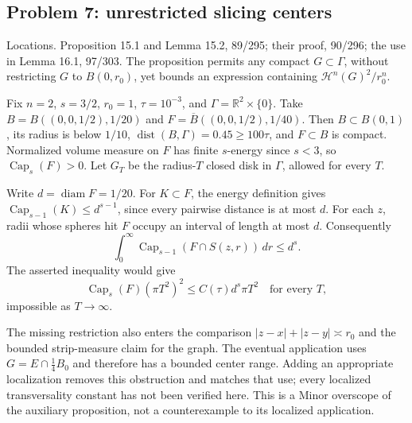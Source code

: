\documentclass[10pt]{article}
\begin{document}
\subsection*{Problem 7: unrestricted slicing centers}
Locations. Proposition 15.1 and Lemma 15.2, 89/295; their proof, 90/296; the use in Lemma 16.1, 97/303. The proposition permits any compact \(G\subset\Gamma\), without restricting \(G\) to \(B(0,r_0)\), yet bounds an expression containing \(\mathcal H^n(G)^2/r_0^n\).\par
Fix \(n=2\), \(s=3/2\), \(r_0=1\), \(\tau=10^{-3}\), and \(\Gamma=\mathbb R^2\times\{0\}\). Take \(B=B((0,0,1/2),1/20)\) and \(F=\overline B((0,0,1/2),1/40)\). Then \(B\subset B(0,1)\), its radius is below \(1/10\), \(\operatorname{dist}(B,\Gamma)=0.45\ge100\tau\), and \(F\subset B\) is compact. Normalized volume measure on \(F\) has finite \(s\)-energy since \(s<3\), so \(\operatorname{Cap}_s(F)>0\). Let \(G_T\) be the radius-\(T\) closed disk in \(\Gamma\), allowed for every \(T\).\par
Write \(d=\operatorname{diam}F=1/20\). For \(K\subset F\), the energy definition gives \(\operatorname{Cap}_{s-1}(K)\le d^{s-1}\), since every pairwise distance is at most \(d\). For each \(z\), radii whose spheres hit \(F\) occupy an interval of length at most \(d\). Consequently \[\int_0^\infty\operatorname{Cap}_{s-1}(F\cap S(z,r))\,dr\le d^s.\] The asserted inequality would give \[\operatorname{Cap}_s(F)(\pi T^2)^2\le C(\tau)d^s\pi T^2
 \quad\text{for every }T,\] impossible as \(T\to\infty\).\par
The missing restriction also enters the comparison \(|z-x|+|z-y|\asymp r_0\) and the bounded strip-measure claim for the graph. The eventual application uses \(G=E\cap\frac14B_0\) and therefore has a bounded center range. Adding an appropriate localization removes this obstruction and matches that use; every localized transversality constant has not been verified here. This is a Minor overscope of the auxiliary proposition, not a counterexample to its localized application.\par
\end{document}
